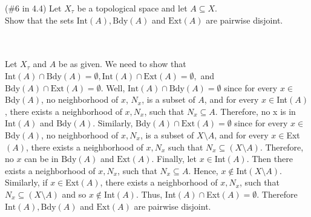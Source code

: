 (\#6 in 4.4) Let $X_{\tau}$ be a topological space and let $A\subseteq X$.\\
Show that the sets $\text{Int}(A), \text{Bdy}(A)$ and $\text{Ext}(A)$ are pairwise disjoint.\\\\

\begin{solution}\renewcommand{\qedsymbol}{}\ \\
    Let $X_{\tau}$ and $A$ be as given. We need to show that
    $\text{Int}(A)\cap\text{Bdy}(A)=\emptyset, \text{Int}(A)\cap\text{Ext}(A)=\emptyset,$ and
    $\text{Bdy}(A)\cap\text{Ext}(A)=\emptyset$. Well, $\text{Int}(A)\cap\text{Bdy}(A)=\emptyset$ since
    for every $x\in$Bdy$(A)$, no neighborhood of $x$, $N_x$, is a subset of $A$, and for every
    $x\in$Int$(A)$, there exists a neighborhood of $x, N_x$, such that $N_x\subseteq A$. Therefore, no
    x is in $\text{Int}(A)$ and $\text{Bdy}(A)$. Similarly, $\text{Bdy}(A)\cap\text{Ext}(A)=\emptyset$
    since for every $x\in$Bdy$(A)$, no neighborhood of $x, N_x$, is a subset of $X\setminus A$, and for
    every $x\in$Ext$(A)$, there exists a neighborhood of $x, N_x$ such that
    $N_x\subseteq(X\setminus A)$. Therefore, no $x$ can be in $\text{Bdy}(A)$ and $\text{Ext}(A)$.
    Finally, let $x\in$Int$(A)$. Then there exists a neighborhood of $x, N_x$, such that
    $N_x\subseteq A$. Hence, $x\notin$Int$(X\setminus A)$. Similarly, if $x\in$Ext$(A)$, there exists a
    neighborhood of $x, N_x$, such that $N_x\subseteq(X\setminus A)$ and so $x\notin$Int$(A)$. Thus,
    Int$(A)\cap$Ext$(A)=\emptyset$. Therefore $\text{Int}(A), \text{Bdy}(A)$ and $\text{Ext}(A)$ are
    pairwise disjoint.

\end{solution}